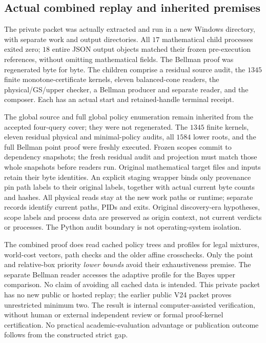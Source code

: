 \subsection{Actual combined replay and inherited premises}
The private packet
 was actually extracted
and run in a new Windows directory, with separate work and output
directories. All $17$ mathematical child processes exited zero;
$18$ entire JSON output objects matched their frozen pre-execution
references, without omitting mathematical fields. The Bellman
proof was regenerated byte for byte. The children comprise a
residual source audit, the $1345$ finite monotone-certificate
kernels, eleven balanced-cone readers, the physical/GS/upper
checker, a Bellman producer and separate reader, and the composer.
Each has an actual start and retained-handle terminal receipt.

The global source and full global policy enumeration remain
inherited from the accepted four-query cover; they were not
regenerated. The $1345$ finite kernels, eleven residual physical
and minimal-policy audits, all $1584$ lower roots, and the full
Bellman point proof were freshly executed. Frozen scopes commit
to dependency snapshots; the fresh residual audit and projection
must match those whole snapshots before readers run. Original
mathematical target files and inputs retain their byte identities.
An explicit staging wrapper binds only provenance pin path labels
to their original labels, together with actual current byte counts
and hashes. All physical reads stay at the new work paths or
runtime; separate records identify current paths, PIDs and exits.
Original discovery-era hypotheses, scope labels and process data
are preserved as origin context, not current verdicts or processes.
The Python audit boundary is not operating-system isolation.

The combined proof does read cached policy trees and profiles for
legal mixtures, world-cost vectors, path checks and the older
affine crosschecks. Only the point and relative-box priority
\emph{lower bounds} avoid their exhaustiveness premise. The
separate Bellman reader accesses the adaptive profile for the
Bayes upper comparison. No claim of avoiding all cached data is
intended. This private packet has no new public or hosted replay;
the earlier public V24 packet proves unrestricted minimum two.
The result is internal computer-assisted verification, without
human or external independent review or formal proof-kernel
certification. No practical academic-evaluation advantage or
publication outcome follows from the constructed strict gap.

